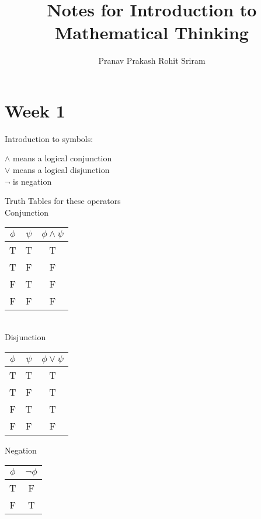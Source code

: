 \documentclass[]{article}
\begin{document}
\title{Notes for Introduction to Mathematical Thinking}
\author{Pranav Prakash \cr Rohit Sriram}
\maketitle

\pagebreak
\tableofcontents
\pagebreak

\section{Week 1}

Introduction to symbols:

\begin{center}

	\begin{framed}
		$\wedge$ means a logical conjunction \\
	 	$\vee$ means a logical disjunction \\
	 	$\neg$ is negation
	\end{framed}
	
	Truth Tables for these operators \\
	\bigskip
	\bigskip
	Conjunction \\
	\bigskip
	
	\begin{tabular}{c c | c}
		$\phi$ & $\psi$ & $\phi \wedge \psi$ \\ \hline
		T & T & T \\
		T & F & F \\
		F & T & F \\
		F & F & F
	\end{tabular} \\
	
	\bigskip
	\bigskip
	Disjunction \\
	\bigskip
	
	\begin{tabular}{c c | c}
		$\phi$ & $\psi$ & $\phi \vee \psi$ \\ \hline
		T & T & T \\
		T & F & T \\
		F & T & T \\
		F & F & F
	\end{tabular}
	
	\bigskip
	\bigskip
	Negation \\
	\bigskip
	
	\begin{tabular}{c | c}
		$\phi$ & $\neg \phi$ \\ \hline
		T & F \\
		F & T
	\end{tabular}
	
\end{center}
\end{document}
